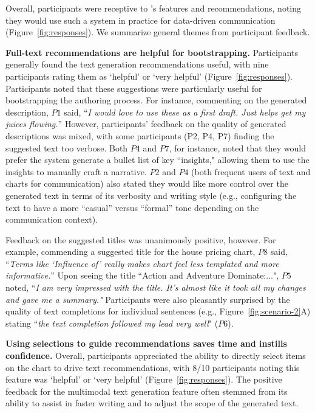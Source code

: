 Overall, participants were receptive to \pluto's features and recommendations, noting they would use such a system in practice for data-driven communication (Figure~\ref{fig:responses}). We summarize general themes from participant feedback.


\vspace{.5em}
\noindent\textbf{Full-text recommendations are helpful for bootstrapping.}
Participants generally found the text generation recommendations useful, with nine participants rating them as `helpful' or `very helpful' (Figure~\ref{fig:responses}).
Participants noted that these suggestions were particularly useful for bootstrapping the authoring process. For instance, commenting on the generated description, $P1$ said, ``\textit{I would love to use these as a first draft. Just helps get my juices flowing.}''
However, participants' feedback on the quality of generated descriptions was mixed, with some participants (P2, P4, P7) finding the suggested text too verbose.
Both $P4$ and $P7$, for instance, noted that they would prefer the system generate a bullet list of key ``insights," allowing them to use the insights to manually craft a narrative.
$P2$ and $P4$ (both frequent users of text and charts for communication) also stated they would like more control over the generated text in terms of its verbosity and writing style (e.g., configuring the text to have a more ``casual'' versus ``formal'' tone depending on the communication context).

Feedback on the suggested titles was unanimously positive, however.
For example, commending a suggested title for the house pricing chart, $P8$ said, ``\textit{Terms like `Influence of' really makes chart feel less templated and more informative.}''
Upon seeing the title ``Action and Adventure Dominate:...", $P5$ noted, ``\textit{I am very impressed with the title. It's almost like it took all my changes and gave me a summary."}
Participants were also pleasantly surprised by the quality of text completions for individual sentences (e.g., Figure~\ref{fig:scenario-2}A) stating ``\textit{the text completion followed my lead very well}" ($P6$).


\vspace{.5em}
\noindent\textbf{Using selections to guide recommendations saves time and instills confidence.}
Overall, participants appreciated the ability to directly select items on the chart to drive text recommendations, with 8/10 participants noting this feature was `helpful' or `very helpful' (Figure~\ref{fig:responses}).
The positive feedback for the multimodal text generation feature often stemmed from its ability to assist in faster writing and to adjust the scope of the generated text.

